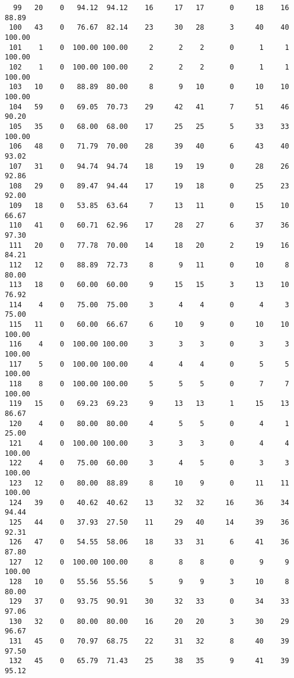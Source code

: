 \begin{verbatim}
  99   20    0   94.12  94.12    16     17   17      0     18    16    88.89
 100   43    0   76.67  82.14    23     30   28      3     40    40   100.00
 101    1    0  100.00 100.00     2      2    2      0      1     1   100.00
 102    1    0  100.00 100.00     2      2    2      0      1     1   100.00
 103   10    0   88.89  80.00     8      9   10      0     10    10   100.00
 104   59    0   69.05  70.73    29     42   41      7     51    46    90.20
 105   35    0   68.00  68.00    17     25   25      5     33    33   100.00
 106   48    0   71.79  70.00    28     39   40      6     43    40    93.02
 107   31    0   94.74  94.74    18     19   19      0     28    26    92.86
 108   29    0   89.47  94.44    17     19   18      0     25    23    92.00
 109   18    0   53.85  63.64     7     13   11      0     15    10    66.67
 110   41    0   60.71  62.96    17     28   27      6     37    36    97.30
 111   20    0   77.78  70.00    14     18   20      2     19    16    84.21
 112   12    0   88.89  72.73     8      9   11      0     10     8    80.00
 113   18    0   60.00  60.00     9     15   15      3     13    10    76.92
 114    4    0   75.00  75.00     3      4    4      0      4     3    75.00
 115   11    0   60.00  66.67     6     10    9      0     10    10   100.00
 116    4    0  100.00 100.00     3      3    3      0      3     3   100.00
 117    5    0  100.00 100.00     4      4    4      0      5     5   100.00
 118    8    0  100.00 100.00     5      5    5      0      7     7   100.00
 119   15    0   69.23  69.23     9     13   13      1     15    13    86.67
 120    4    0   80.00  80.00     4      5    5      0      4     1    25.00
 121    4    0  100.00 100.00     3      3    3      0      4     4   100.00
 122    4    0   75.00  60.00     3      4    5      0      3     3   100.00
 123   12    0   80.00  88.89     8     10    9      0     11    11   100.00
 124   39    0   40.62  40.62    13     32   32     16     36    34    94.44
 125   44    0   37.93  27.50    11     29   40     14     39    36    92.31
 126   47    0   54.55  58.06    18     33   31      6     41    36    87.80
 127   12    0  100.00 100.00     8      8    8      0      9     9   100.00
 128   10    0   55.56  55.56     5      9    9      3     10     8    80.00
 129   37    0   93.75  90.91    30     32   33      0     34    33    97.06
 130   32    0   80.00  80.00    16     20   20      3     30    29    96.67
 131   45    0   70.97  68.75    22     31   32      8     40    39    97.50
 132   45    0   65.79  71.43    25     38   35      9     41    39    95.12

\end{verbatim}
